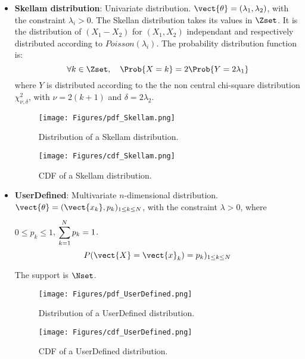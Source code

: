 {\begin{itemize}
\item {\bf Skellam distribution}: Univariate distribution. $\vect{\theta} = (\lambda_1, \lambda_2)$, with the constraint $\lambda_i>0$. The Skellan distribution takes its values in $\Zset$. It is the distribution of $(X_1-X_2)$ for $(X_1, X_2)$ independant and respectively distributed according to $Poisson(\lambda_i)$. The probability distribution function is:
\begin{equation}
\forall k \in \Zset, \quad \Prob{X = k} = 2\Prob{Y=2\lambda_1}
\end{equation}
where $Y$ is distributed according to the  the non central chi-square distribution $\chi^2_{\nu, \delta}$, with $\nu=2(k+1)$ and $\delta=2\lambda_2$.



\begin{figure}[H]
\begin{minipage}{8cm}
\begin{center}
\texttt{[image: Figures/pdf\_Skellam.png]}
\caption{Distribution of a  Skellam distribution.}
\label{PDFSkellam}
\end{center}
\end{minipage}
\hfill
\begin{minipage}{8cm}
\begin{center}
\texttt{[image: Figures/cdf\_Skellam.png]}
\caption{CDF of a Skellam distribution.}
\label{CDFSkellam}
\end{center}
\end{minipage}
\end{figure}




\item {\bf UserDefined}:  Multivariate $n$-dimensional distribution. $\vect{\theta} = (\vect{x_k}, p_k)_{1 \leq k \leq N}$, with the constraint $\lambda > 0$, where $0\leq p_k \leq 1$, $\displaystyle \sum_{k=1}^{N^{\strut}} p_k = 1$.
\begin{equation}
P(\vect{X} = \vect{x}_k) = p_k)_{1 \leq k \leq N}
\end{equation}

The support is $\Nset$.


\begin{figure}[H]
\begin{minipage}{8cm}
\begin{center}
\texttt{[image: Figures/pdf\_UserDefined.png]}
\caption{Distribution of a  UserDefined distribution.}
\label{PDFUserDefined}
\end{center}
\end{minipage}
\hfill
\begin{minipage}{8cm}
\begin{center}
\texttt{[image: Figures/cdf\_UserDefined.png]}
\caption{CDF of a UserDefined distribution.}
\label{CDFUserDefined}
\end{center}
\end{minipage}
\end{figure}




\end{itemize}}
